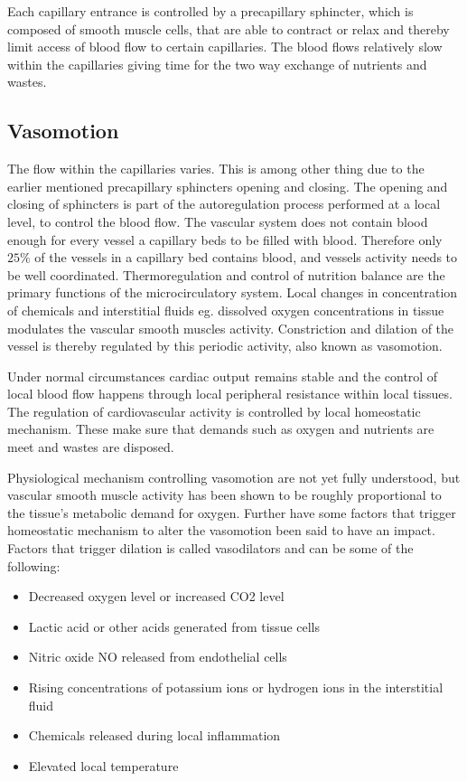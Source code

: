Each capillary entrance is controlled by a precapillary sphincter, which is composed of smooth muscle cells, that are able to contract or relax and thereby limit access of blood flow to certain capillaries. The blood flows relatively slow within the capillaries giving time for the two way exchange of nutrients and wastes. \cite{martini2012}

\subsection{Vasomotion}

The flow within the capillaries varies. This is among other thing due to the earlier mentioned precapillary sphincters opening and closing. The opening and closing of sphincters is part of the autoregulation process performed at a local level, to control the blood flow. The vascular system does not contain blood enough for every vessel a capillary beds to be filled with blood. Therefore only $25\%$ of the vessels in a capillary bed contains blood, and vessels activity needs to be well coordinated. Thermoregulation and control of nutrition balance are the primary functions of the microcirculatory system. Local changes in concentration of chemicals and interstitial fluids eg. dissolved oxygen concentrations in tissue modulates the vascular smooth muscles activity. Constriction and dilation of the vessel is thereby regulated by this periodic activity, also known as vasomotion. \cite{martini2012,geyer2004}

Under normal circumstances cardiac output remains stable and the control of local blood flow happens through local peripheral resistance within local tissues. The regulation of cardiovascular activity is controlled by local homeostatic mechanism. These make sure that demands such as oxygen and nutrients are meet and wastes are disposed.\cite{martini2012}

Physiological mechanism controlling vasomotion are not yet fully understood, but vascular smooth muscle activity has been shown to be roughly proportional to the tissue’s metabolic demand for oxygen.\cite{geyer2004}
Further have some factors that trigger homeostatic mechanism to alter the vasomotion been said to have an impact. Factors that trigger dilation is called vasodilators and can be some of the following:\cite{martini2012,geyer2004}  
\begin{itemize}
	\item Decreased oxygen level or increased CO2 level
	\item Lactic acid or other acids generated from tissue cells
	\item Nitric oxide NO released from endothelial cells
	\item Rising concentrations of potassium ions or hydrogen ions in the interstitial fluid
	\item Chemicals released during local inflammation
	\item Elevated local temperature
\end{itemize} 


